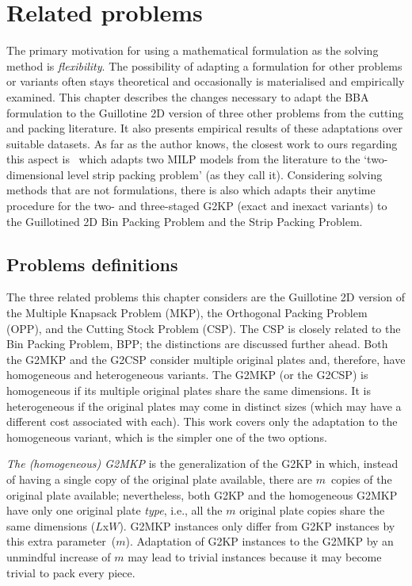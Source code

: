 \chapter{Related problems}
\label{sec:other_problems}

The primary motivation for using a mathematical formulation as the solving method is \emph{flexibility}.
The possibility of adapting a formulation for other problems or variants often stays theoretical and occasionally is materialised and empirically examined.
This chapter describes the changes necessary to adapt the BBA formulation to the Guillotine 2D version of three other problems from the cutting and packing literature.
It also presents empirical results of these adaptations over suitable datasets.
As far as the author knows, the closest work to ours regarding this aspect is~\citet{bezerra:2020} which adapts two MILP models from the literature to the `two-dimensional level strip packing problem' (as they call it).
Considering solving methods that are not formulations, there is also \citet{fontan:2020} which adapts their anytime procedure for the two- and three-staged G2KP (exact and inexact variants) to the Guillotined 2D Bin Packing Problem and the Strip Packing Problem.

\section{Problems definitions}

The three related problems this chapter considers are the Guillotine 2D version of the Multiple Knapsack Problem (MKP), the Orthogonal Packing Problem (OPP), and the Cutting Stock Problem (CSP).
The CSP is closely related to the Bin Packing Problem, BPP; the distinctions are discussed further ahead.
Both the G2MKP and the G2CSP consider multiple original plates and, therefore, have homogeneous and heterogeneous variants.
The G2MKP (or the G2CSP) is homogeneous if its multiple original plates share the same dimensions.
It is heterogeneous if the original plates may come in distinct sizes (which may have a different cost associated with each).
 This work covers only the adaptation to the homogeneous variant, which is the simpler one of the two options.

\emph{The (homogeneous) G2MKP} is the generalization of the G2KP in which, instead of having a single copy of the original plate available, there are \(m\)~copies of the original plate available; nevertheless, both G2KP and the homogeneous G2MKP have only one original plate \emph{type}, i.e., all the \(m\) original plate copies share the same dimensions (\(L\)x\(W\)).
G2MKP instances only differ from G2KP instances by this extra parameter~(\(m\)).
Adaptation of G2KP instances to the G2MKP by an unmindful increase of \(m\) may lead to trivial instances because it may become trivial to pack every piece.


